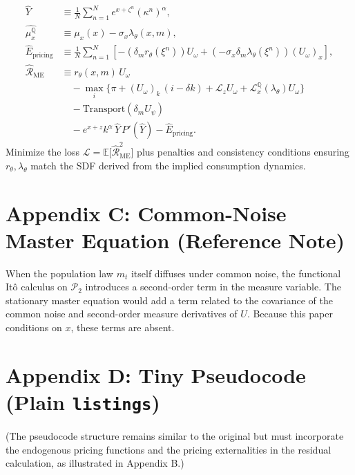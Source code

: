 \documentclass[11pt,letterpaper,oneside]{article}
\newcommand{\E}{\mathbb{E}}
\newcommand{\Lz}{\mathcal{L}_z}
\newcommand{\LxQ}{\mathcal{L}_x^{\mathbb{Q}}}
\newcommand{\muxQ}{\mu_x^{\mathbb{Q}}}
\newcommand{\dmU}{\delta_m U}
\begin{document}
\begin{align*}
\widehat{Y} &\equiv \frac{1}{N}\sum_{n=1}^N e^{x+\zeta^n}(\kappa^n)^\alpha,\\
\widehat{\muxQ} &\equiv \mu_x(x) - \sigma_x \lambda_\theta(x,m),\\
\widehat{E}_{\text{pricing}} &\equiv \frac{1}{N}\sum_{n=1}^N \left[ -(\delta_m r_\theta(\xi^n)) U_\omega + (-\sigma_x \delta_m \lambda_\theta(\xi^n)) (U_\omega)_x \right],\\
\widehat{\mathcal{R}}_{\mathrm{ME}} &\equiv r_\theta(x,m)\,U_\omega\\
  &\quad - \max_{i}\Big\{ \pi + (U_{\omega})_k\,(i-\delta k) + \Lz U_{\omega} + \LxQ(\lambda_\theta) U_{\omega} \Big\} \\
  &\quad - \text{Transport}(\dmU_\psi) \\
  &\quad - e^{x+z}k^{\alpha}\,\widehat{Y}\,P'(\widehat{Y}) - \widehat{E}_{\text{pricing}}.
  \end{align*}
Minimize the loss $\mathcal{L}=\E\big[\widehat{\mathcal{R}}_{\mathrm{ME}}^2\big]$ plus penalties and consistency conditions ensuring $r_\theta, \lambda_\theta$ match the SDF derived from the implied consumption dynamics.

\section{Appendix C: Common-Noise Master Equation (Reference Note)}\label{app:common-noise}

When the population law $m_t$ itself diffuses under common noise, the functional Itô calculus on $\mathcal P_2$ introduces a second-order term in the measure variable. The stationary master equation would add a term related to the covariance of the common noise and second-order measure derivatives of $U$. Because this paper conditions on $x$, these terms are absent.

\section{Appendix D: Tiny Pseudocode (Plain \texorpdfstring{\texttt{listings}}{listings})}\label{app:code}

(The pseudocode structure remains similar to the original but must incorporate the endogenous pricing functions and the pricing externalities in the residual calculation, as illustrated in Appendix B.)
\end{document}

